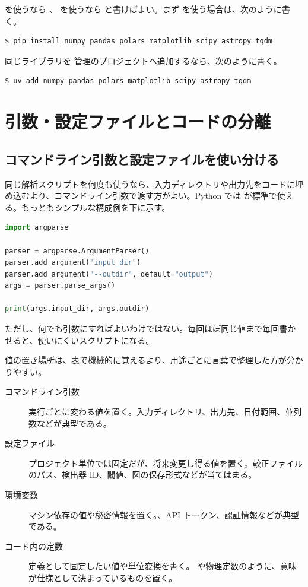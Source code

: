  を使うなら 、 を使うなら  と書けばよい。まず  を使う場合は、次のように書く。

\begin{lstlisting}[numbers=none, xleftmargin=2\zw]
$ pip install numpy pandas polars matplotlib scipy astropy tqdm
\end{lstlisting}

同じライブラリを  管理のプロジェクトへ追加するなら、次のように書く。

\begin{lstlisting}[numbers=none, xleftmargin=2\zw]
$ uv add numpy pandas polars matplotlib scipy astropy tqdm
\end{lstlisting}

\section{引数・設定ファイルとコードの分離}

\subsection{コマンドライン引数と設定ファイルを使い分ける}

同じ解析スクリプトを何度も使うなら、入力ディレクトリや出力先をコードに埋め込むより、コマンドライン引数で渡す方がよい。Python では  が標準で使える。もっともシンプルな構成例を下に示す。

\begin{lstlisting}[language=Python]
import argparse

parser = argparse.ArgumentParser()
parser.add_argument("input_dir")
parser.add_argument("--outdir", default="output")
args = parser.parse_args()

print(args.input_dir, args.outdir)
\end{lstlisting}

ただし、何でも引数にすればよいわけではない。毎回ほぼ同じ値まで毎回書かせると、使いにくいスクリプトになる。

値の置き場所は、表で機械的に覚えるより、用途ごとに言葉で整理した方が分かりやすい。

\begin{description}
\item[コマンドライン引数] 実行ごとに変わる値を置く。入力ディレクトリ、出力先、日付範囲、並列数などが典型である。
\item[設定ファイル] プロジェクト単位では固定だが、将来変更し得る値を置く。較正ファイルのパス、検出器 ID、閾値、図の保存形式などが当てはまる。
\item[環境変数] マシン依存の値や秘密情報を置く。、API トークン、認証情報などが典型である。
\item[コード内の定数] 定義として固定したい値や単位変換を書く。 や物理定数のように、意味が仕様として決まっているものを置く。
\end{description}

